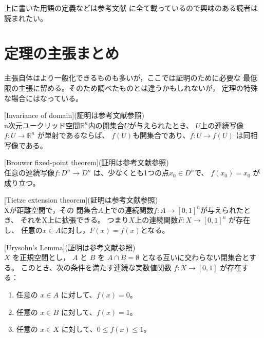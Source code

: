 \documentclass[uplatex]{jsarticle}
\begin{document}
上に書いた用語の定義などは参考文献\cite{kawazumi}
に全て載っているので興味のある読者は読まれたい。




\section{定理の主張まとめ}\label{Fact}
主張自体はより一般化できるものも多いが，ここでは証明のために必要な
最低限の主張に留める。そのため調べたものとは違うかもしれないが，
定理の特殊な場合にはなっている。

\begin{fact}\label{Fact:Invariance of domain}[Invariance of domain](証明は参考文献\cite{tao}参照)\\
    n次元ユークリッド空間$\mathbb{R}^n$内の開集合$U$が与えられたとき、
    $U$上の連続写像$f: U \rightarrow \mathbb{R}^n$ が単射であるならば、
    $f(U)$も開集合であり、$f: U \rightarrow f(U)$ は同相写像である。
\end{fact}

\begin{fact}\label{Fact:Brouwer fixed-point theorem}[Brouwer fixed-point theorem](証明は参考文献\cite{kawazumi}参照)\\
    任意の連続写像$f: D^n \rightarrow D^n$
    は、少なくとも1つの点$x_0 \in D^n$で、
    $f(x_0) = x_0$ が成り立つ。
\end{fact}


\begin{fact}\label{Fact:Tietze extension theorem}[Tietze extension theorem](証明は参考文献\cite{kawazumi}参照)\\
    Xが距離空間で，その
    閉集合$A$上での連続関数$f: A \rightarrow [0, 1]^n$が与えられたとき、
    それをX上に拡張できる。
    つまり$X$上の連続関数$F: X \rightarrow [0, 1]^n$ が存在し、
    任意の\(x\in Aに対し，F(x) = f(x)\)となる。
\end{fact}




\begin{fact}\label{Fact:Urysohn's Lemma}[Urysohn's Lemma](証明は参考文献\cite{kawazumi}参照)\\
    \(X\) を正規空間とし，
    \(A\) と \(B\) を \(A \cap B = \emptyset\) となる互いに交わらない閉集合とする。
    このとき、次の条件を満たす連続な実数値関数 \(f: X \to [0, 1]\)
    が存在する：
    \begin{enumerate}
        \item 任意の \(x \in A\) に対して、\(f(x) = 0\)。
        \item 任意の \(x \in B\) に対して、\(f(x) = 1\)。
        \item 任意の \(x \in X\) に対して、\(0 \leq f(x) \leq 1\)。
    \end{enumerate}
\end{fact}
\end{document}
